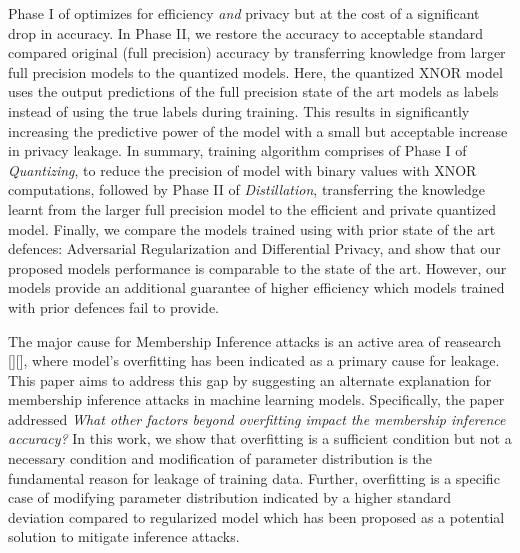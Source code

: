 Phase I of \method\hspace{0.02in} optimizes for efficiency \textit{and} privacy but at the cost of a significant drop in accuracy.
In Phase II, we restore the accuracy to acceptable standard compared original (full precision) accuracy by transferring knowledge from larger full precision models to the quantized models.
Here, the quantized XNOR model uses the output predictions of the full precision state of the art models as labels instead of using the true labels during training.
This results in significantly increasing the predictive power of the model with a small but acceptable increase in privacy leakage.
In summary, \method\hspace{0.02in} training algorithm comprises of Phase I of \textit{Quantizing}, to reduce the precision of model with binary values with XNOR computations, followed by Phase II of \textit{Distillation}, transferring the knowledge learnt from the larger full precision model to the efficient and private quantized model.
Finally, we compare the models trained using \method\hspace{0.02in} with prior state of the art defences: Adversarial Regularization and Differential Privacy, and show that our proposed models performance is comparable to the state of the art.
However, our models provide an additional guarantee of higher efficiency which models trained with prior defences fail to provide.

The major cause for Membership Inference attacks is an active area of reasearch [][], where model's overfitting has been indicated as a primary cause for leakage.
This paper aims to address this gap by suggesting an alternate explanation for membership inference attacks in machine learning models.
Specifically, the paper addressed \textit{What other factors beyond overfitting impact the membership inference accuracy?}
In this work, we show that overfitting is a sufficient condition but not a necessary condition and modification of parameter distribution is the fundamental reason for leakage of training data.
Further, overfitting is a specific case of modifying parameter distribution indicated by a higher standard deviation compared to regularized model which has been proposed as a potential solution to mitigate inference attacks.
